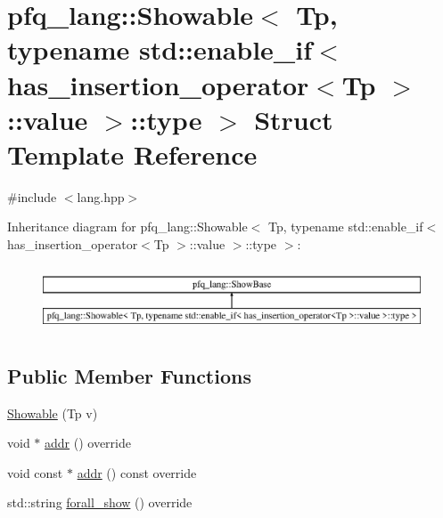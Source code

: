 \hypertarget{structpfq__lang_1_1Showable_3_01Tp_00_01typename_01std_1_1enable__if_3_01has__insertion__operato0cfb72d444f463b2d87a78275e86feaa}{\section{pfq\+\_\+lang\+:\+:Showable$<$ Tp, typename std\+:\+:enable\+\_\+if$<$ has\+\_\+insertion\+\_\+operator$<$Tp $>$\+:\+:value $>$\+:\+:type $>$ Struct Template Reference}
\label{structpfq__lang_1_1Showable_3_01Tp_00_01typename_01std_1_1enable__if_3_01has__insertion__operato0cfb72d444f463b2d87a78275e86feaa}
}


{\ttfamily \#include $<$lang.\+hpp$>$}

Inheritance diagram for pfq\+\_\+lang\+:\+:Showable$<$ Tp, typename std\+:\+:enable\+\_\+if$<$ has\+\_\+insertion\+\_\+operator$<$Tp $>$\+:\+:value $>$\+:\+:type $>$\+:\begin{figure}[H]
\begin{center}
\leavevmode
\includegraphics[height=1.989343cm]{structpfq__lang_1_1Showable_3_01Tp_00_01typename_01std_1_1enable__if_3_01has__insertion__operato0cfb72d444f463b2d87a78275e86feaa}
\end{center}
\end{figure}
\subsection*{Public Member Functions}
\begin{DoxyCompactItemize}
\item 
\hyperlink{structpfq__lang_1_1Showable_3_01Tp_00_01typename_01std_1_1enable__if_3_01has__insertion__operato0cfb72d444f463b2d87a78275e86feaa_ac23caa2d27a31d9e9e896d980e589905}{Showable} (Tp v)
\item 
void $\ast$ \hyperlink{structpfq__lang_1_1Showable_3_01Tp_00_01typename_01std_1_1enable__if_3_01has__insertion__operato0cfb72d444f463b2d87a78275e86feaa_aab540570f9d74a3c25b5677a9c583da8}{addr} () override
\item 
void const $\ast$ \hyperlink{structpfq__lang_1_1Showable_3_01Tp_00_01typename_01std_1_1enable__if_3_01has__insertion__operato0cfb72d444f463b2d87a78275e86feaa_af84f9989c7e73f7106aba4593574654e}{addr} () const override
\item 
std\+::string \hyperlink{structpfq__lang_1_1Showable_3_01Tp_00_01typename_01std_1_1enable__if_3_01has__insertion__operato0cfb72d444f463b2d87a78275e86feaa_a59c99f84a35116f3f03e63164c65258f}{forall\+\_\+show} () override
\end{DoxyCompactItemize}
